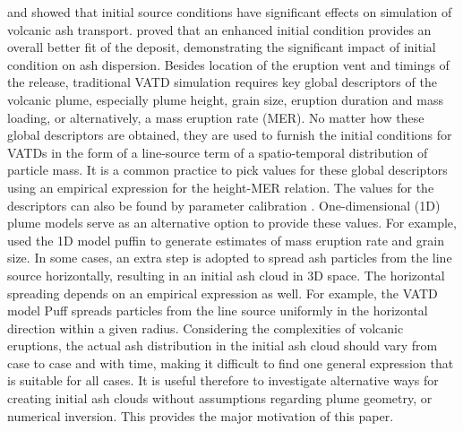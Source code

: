 \documentclass[utf8]{frontiersSCNS} %
\begin{document}
\citet{fero2009simulating} and \citet{stohl2011determination} showed that initial source conditions have significant effects on simulation of volcanic ash transport. \citet{constantinescu2021radius} proved that an enhanced initial condition provides an overall better fit of the deposit, demonstrating the significant impact of initial condition on ash dispersion. Besides location of the eruption vent and timings of the release, traditional VATD simulation requires key global descriptors of the volcanic plume, especially plume height, grain size, eruption duration and mass loading, or alternatively, a mass eruption rate (MER). No matter how these global descriptors are obtained, they are used to furnish the initial conditions for VATDs in the form of a line-source term of a spatio-temporal distribution of particle mass. It is a common practice to pick values for these global descriptors using an empirical expression for the height-MER relation. The values for the descriptors can also be found by parameter calibration \citep[e.g.][]{fero2008simulation,fero2009simulating, stohl2011determination, zidikheri2017estimation}. One-dimensional (1D) plume models serve as an alternative option to provide these values. For example, \citet{bursik2012estimation} used the 1D model puffin \citep{bursik2001effect} to generate estimates of mass eruption rate and grain size. In some cases, an extra step is adopted to spread ash particles from the line source horizontally, resulting in an initial ash cloud in 3D space. The horizontal spreading depends on an empirical expression as well. For example, the VATD model Puff spreads particles from the line source uniformly in the horizontal direction within a given radius. Considering the complexities of volcanic eruptions, the actual ash distribution in the initial ash cloud should vary from case to case and with time, making it difficult to find one general expression that is suitable for all cases. It is useful therefore to investigate alternative ways for creating initial ash clouds without assumptions regarding plume geometry, or numerical inversion. This provides the major motivation of this paper.
\end{document}
